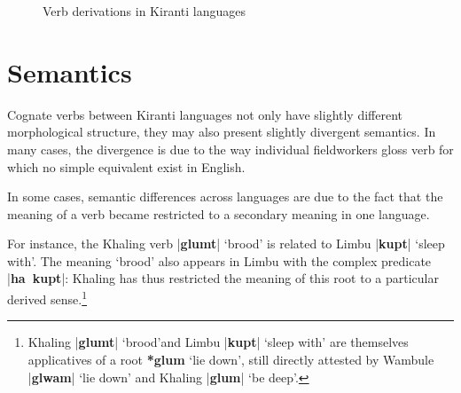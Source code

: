 \documentclass[oneside,a4paper,11pt]{article}
\newcommand{\ipa}[1]{\textbf{{\phon\mbox{#1}}}} %
\newcommand{\dhatu}[2]{|\ipa{#1}| `#2'}
\newcommand{\dhat}[1]{|\ipa{#1}|}
\begin{document}
   \begin{figure}[H]
   \caption{Verb derivations in Kiranti languages} \label{fig:kiranti.derivations}  
\end{figure}

\section{Semantics} \label{sec:semantic}
Cognate verbs between Kiranti languages not only have slightly different morphological structure, they may also present slightly divergent semantics. In many cases, the divergence is due to the way individual fieldworkers gloss verb for which no simple equivalent exist in English.

In some cases, semantic differences across languages are due to the fact that the meaning of a verb became restricted to a secondary meaning in one language. 

For instance, the Khaling verb \dhatu{glumt}{brood} is related to Limbu \dhatu{kupt}{sleep with}. The meaning `brood' also appears in Limbu with the complex predicate \dhat{ha kupt}: Khaling has thus restricted the meaning of this root to a particular derived sense.\footnote{Khaling \dhatu{glumt}{brood}and Limbu  \dhatu{kupt}{sleep with} are themselves applicatives of a root \ipa{*glum} `lie down', still directly attested by Wambule  \dhatu{glwam}{lie down} and Khaling \dhatu{glum}{be deep}.  }
\end{document}
